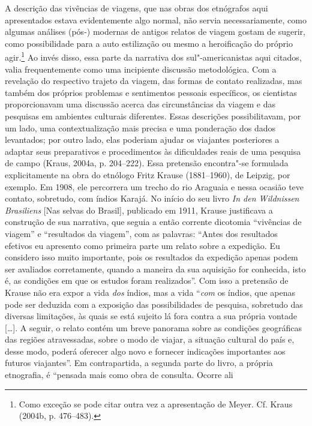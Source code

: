 A descrição das vivências de viagens, que nas obras dos etnógrafos aqui
apresentados estava evidentemente algo normal, não servia
necessariamente, como algumas análises (pós-) modernas de antigos
relatos de viagem gostam de sugerir, como possibilidade para a auto
estilização ou mesmo a heroificação do próprio agir.\footnote{Como
  exceção se pode citar outra vez a apresentação de Meyer. Cf. Kraus
  (2004b, p. 476--483).} Ao invés disso, essa parte da narrativa dos
sul"-americanistas aqui citados, valia frequentemente como uma incipiente
discussão metodológica. Com a revelação do respectivo trajeto da viagem,
das formas de contato realizadas, mas também dos próprios problemas e
sentimentos pessoais específicos, os cientistas proporcionavam uma
discussão acerca das circunstâncias da viagem e das pesquisas em
ambientes culturais diferentes. Essas descrições possibilitavam, por um
lado, uma contextualização mais precisa e uma ponderação dos dados
levantados; por outro lado, elas poderiam ajudar os viajantes
posteriores a adaptar seus preparativos e procedimentos às dificuldades
reais de uma pesquisa de campo (Kraus, 2004a, p. 204--222). Essa
pretensão encontra"-se formulada explicitamente na obra do etnólogo Fritz
Krause (1881--1960), de Leipzig, por exemplo. Em 1908, ele percorrera um
trecho do rio Araguaia e nessa ocasião teve contato, sobretudo, com
índios Karajá. No início do seu livro \emph{In den Wildnissen
Brasiliens} {[}Nas selvas do Brasil{]}, publicado em 1911, Krause
justificava a construção de sua narrativa, que seguia a então corrente
dicotomia ``vivências de viagem'' e ``resultados da viagem'', com as
palavras: ``Antes dos resultados efetivos eu apresento como primeira
parte um relato sobre a expedição. Eu considero isso muito importante,
pois os resultados da expedição apenas podem ser avaliados corretamente,
quando a maneira da sua aquisição for conhecida, isto é, as condições
em que os estudos foram realizados''. Com isso a pretensão de Krause não
era expor a vida \emph{dos} índios, mas a vida ``\emph{com} os índios,
que apenas pode ser deduzida com a exposição das possibilidades de
pesquisa, sobretudo das diversas limitações, às quais se está sujeito
lá fora contra a sua própria vontade {[}\ldots{}{]}. A seguir, o relato
contém um breve panorama sobre as condições geográficas das regiões
atravessadas, sobre o modo de viajar, a situação cultural do país e,
desse modo, poderá oferecer algo novo e fornecer indicações importantes
aos futuros viajantes''. Em contrapartida, a segunda parte do livro, a
própria etnografia, é ``pensada mais como obra de consulta. Ocorre ali
